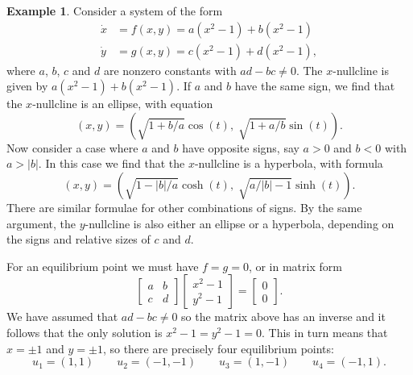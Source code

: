 \documentclass[reqno]{amsart}
\theoremstyle{definition}
\newtheorem{example}[theorem]{Example}
\begin{document}
\newpage

\begin{example}\label{eg-quad}
 Consider a system of the form
 \begin{align*}
  \dot{x} &= f(x,y) = a(x^2-1) + b(x^2-1) \\
  \dot{y} &= g(x,y) = c(x^2-1) + d(x^2-1),
 \end{align*}
 where $a$, $b$, $c$ and $d$ are nonzero constants with $ad-bc\neq 0$. 
 The $x$-nullcline is given by $a(x^2-1)+b(x^2-1)$.  If $a$ and $b$
 have the same sign, we find that the $x$-nullcline is an ellipse,
 with equation 
 \[ (x,y) = (\sqrt{1+b/a}\cos(t),\;\sqrt{1+a/b}\sin(t)). \]
 Now consider a case where $a$ and $b$ have opposite signs, say $a>0$
 and $b<0$ with $a>|b|$.  In this case we find that the $x$-nullcline
 is a hyperbola, with formula
 \[ (x,y) = (\sqrt{1-|b|/a}\cosh(t),\;\sqrt{a/|b|-1}\sinh(t)). \]
 There are similar formulae for other combinations of signs.  By the
 same argument, the $y$-nullcline is also either an ellipse or a
 hyperbola, depending on the signs and relative sizes of $c$ and $d$.  

 For an equilibrium point we must have $f=g=0$, or in matrix form
 \[ \left[\begin{array}{cc} a & b \\ c & d \end{array}\right] \left[\begin{array}{cc} x^2-1 \\ y^2-1 \end{array}\right] =
     \left[\begin{array}{cc} 0 \\ 0\end{array}\right].
 \]
 We have assumed that $ad-bc\neq 0$ so the matrix above has an inverse
 and it follows that the only solution is $x^2-1=y^2-1=0$.  This in
 turn means that $x=\pm 1$ and $y=\pm 1$, so there are precisely four
 equilibrium points:
 \[ u_1 = (1,1) \qquad u_2 = (-1,-1) \qquad
    u_3 = (1,-1) \qquad u_4 = (-1,1).
 \]


\end{example}
\end{document}

